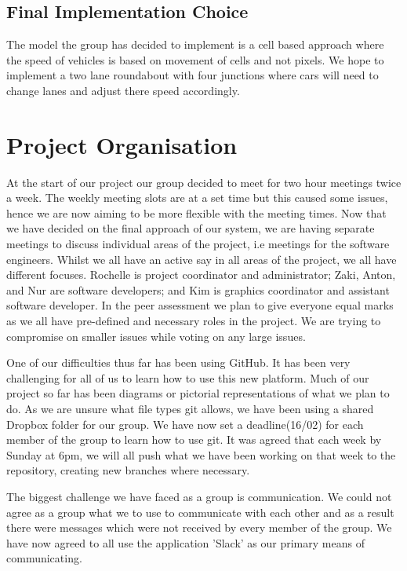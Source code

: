 \documentclass[11pt]{article}
\begin{document}

\subsection{Final Implementation Choice}

	The model the group has decided to implement is a cell based approach where the speed of vehicles is based on movement of cells and not pixels. We hope to implement a two lane roundabout with four junctions where cars will need to change lanes and adjust there speed accordingly.
	
	
	\section{Project Organisation}
		At the start of our project our group decided to meet for two hour meetings twice a week. 
		The weekly meeting slots are at a set time but this caused some issues, hence we are now aiming to be more flexible with the meeting times. 
		Now that we have decided on the final approach of our system, we are having separate meetings to discuss individual areas of the project, i.e meetings for the software engineers. 
		Whilst we all have an active say in all areas of the project, we all have different focuses. 
		Rochelle is project coordinator and administrator; Zaki, Anton, and Nur are software developers; and Kim is graphics coordinator and assistant software developer. 
		In the peer assessment we plan to give everyone equal marks as we all have pre-defined and necessary roles in the project. 
		We are trying to compromise on smaller issues while voting on any large issues. 
		 
		One of our difficulties thus far has been using GitHub. 
		It has been very challenging for all of us to learn how to use this new platform. 
		Much of our project so far has been diagrams or pictorial representations of what we plan to do. 
		As we are unsure what file types git allows, we have been using a shared Dropbox folder for our group. 
		We have now set a deadline(16/02) for each member of the group to learn how to use git. 
		It was agreed that each week by Sunday at 6pm, we will all push what we have been working on that week to the repository, creating new branches where necessary. 
		
		The biggest challenge we have faced as a group is communication. 
		We could not agree as a group what we to use to communicate with each other and as a result there were messages which were not received by every member of the group. 
		We have now agreed to all use the application 'Slack' as our primary means of communicating. 
		
\end{document}
